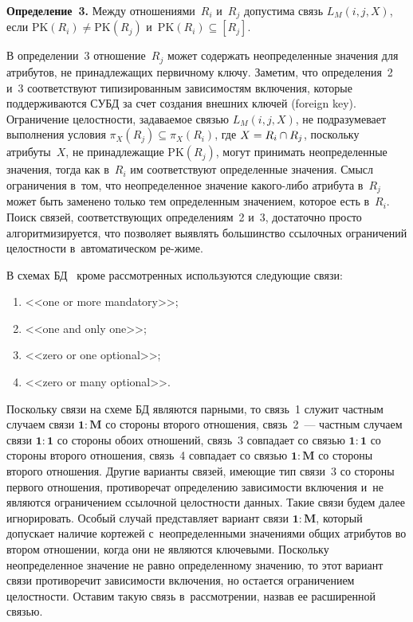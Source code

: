\begin{multicols}{2}
  \noindent
  \textbf{Определение~3.} Между отношениями~$R_i$ и~$R_j$ допустима
связь $L_M(i,j,X)$, если $\mathrm{PK}(R_i)\not= \mathrm{PK}(R_j)$ 
и~$\mathrm{PK}(R_i)\subseteq [R_j]$.

  \smallskip

  В определении~3 отношение~$R_j$ может содержать неопределенные
значения для атрибутов, не принадлежащих первичному ключу. Заметим, что
определения~2 и~3 соответствуют типизированным зависимостям включения,
которые поддерживаются СУБД за счет создания внешних ключей (foreign key).
Ограничение целостности, задаваемое связью $L_M(i,j,X)$, не подразумевает
выполнения условия $\pi_X(R_j)\subseteq \pi_X(R_i)$, где $X\hm= R_i \cap R_j$,
поскольку атрибуты~$X$, не принадлежащие $\mathrm{PK}(R_j)$, могут принимать
неопределенные значения, тогда как в~$R_i$ им соответствуют определенные
значения. Смысл ограничения в~том, что неопределенное значение ка\-ко\-го-ли\-бо
атрибута в~$R_j$ может быть заменено только тем определенным значением,
которое есть в~$R_i$. Поиск связей, соответствующих определениям~2 и~3,
достаточно просто алгоритмизируется, что позволяет выявлять большинство
ссылочных ограничений целостности в~автоматическом ре-\linebreak жиме.

  В схемах БД~\cite{8-z} кроме рассмотренных используются следующие
связи:
\begin{enumerate}[(1)]
\item <<one or more mandatory>>; 
\item <<one and only one>>; 
\item <<zero or one
optional>>; 
\item <<zero or many optional>>. 
\end{enumerate}

Поскольку связи на схеме БД
являются парными, то связь~1 служит частным случаем связи
$\mathbf{1}:\mathbf{M}$ со стороны второго отношения, связь~2~--- частным
случаем связи $\mathbf{1}:\mathbf{1}$ со стороны обоих отношений, связь~3
совпадает со связью $\mathbf{1}:\mathbf{1}$ со стороны второго отношения,
связь~4 совпадает со связью $\mathbf{1}:\mathbf{M}$ со стороны второго
отношения. Другие варианты связей, имеющие тип связи~3 со стороны первого
отношения, противоречат определению зависимости включения и~не являются
ограничением ссылочной целостности данных. Такие связи будем далее
игнорировать. Особый случай представляет вариант связи
$\mathbf{1}:\mathbf{M}$, который допускает наличие кортежей с~неопределенными значениями общих атрибутов во втором отношении, когда
они не являются ключевыми. Поскольку неопределенное значение не равно
определенному значению, то этот вариант связи противоречит зависимости
включения, но остается ограничением целостности. Оставим такую связь в~рассмотрении, назвав ее расширенной связью.


\end{multicols}
